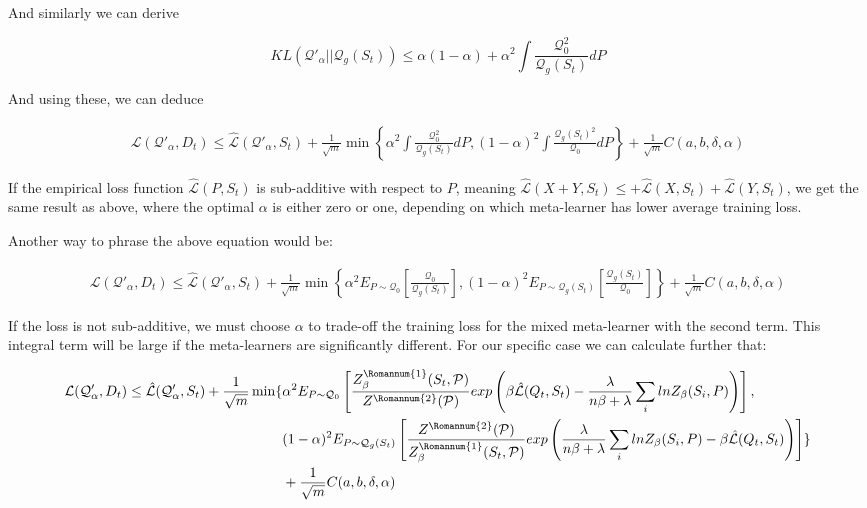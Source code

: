 \documentclass[letterpaper]{article}
\theoremstyle{definition}
\begin{document}
And similarly we can derive 

$$ KL(\mathcal{Q}'_\alpha||\mathcal{Q}_{g}(S_t)) \leq \alpha(1-\alpha) + \alpha^2\int \frac{\mathcal{Q}_0^2}{\mathcal{Q}_{g}(S_t)}  dP$$

And using these, we can deduce

\begin{equation}
\begin{split}
\mathcal{L}(\mathcal{Q}'_\alpha, D_t) \leq  \hat{\mathcal{L}}(\mathcal{Q}'_\alpha, S_t) + \frac{1}{\sqrt{m}}\min\left \{\alpha^2\int \frac{\mathcal{Q}_0^2}{\mathcal{Q}_{g}(S_t)}  dP, (1-\alpha)^2\int \frac{\mathcal{Q}_{g}(S_t)^2}{\mathcal{Q}_0}  dP\right \} + \frac{1}{\sqrt{m}}C(a,b,\delta, \alpha)
\end{split}
\end{equation}

If the empirical loss function $\hat{\mathcal{L}}(P, S_t)$ is sub-additive with respect to $P$, meaning $\hat{\mathcal{L}}(X+Y, S_t)\leq +\hat{\mathcal{L}}(X, S_t)+\hat{\mathcal{L}}(Y, S_t)$,
we get the same result as above, where the optimal $\alpha$ is either zero or one, depending on which meta-learner has lower average training loss.

Another way to phrase the above equation would be:

\begin{equation}
\begin{split}
\mathcal{L}(\mathcal{Q}'_\alpha, D_t) \leq  \hat{\mathcal{L}}(\mathcal{Q}'_\alpha, S_t) + \frac{1}{\sqrt{m}}\min\left \{\alpha^2 E_{P\sim \mathcal{Q}_0} \left [ \frac{\mathcal{Q}_0}{\mathcal{Q}_{g}(S_t)} \right ], (1-\alpha)^2 E_{P\sim \mathcal{Q}_{g}(S_t)} \left [ \frac{\mathcal{Q}_{g}(S_t)}{\mathcal{Q}_0} \right ]\right \} + \frac{1}{\sqrt{m}}C(a,b,\delta, \alpha)
\end{split}
\end{equation}

If the loss is not sub-additive, we must choose $\alpha$ to trade-off the training loss for the mixed meta-learner with the second term. This integral term will be large if the meta-learners are significantly different. For our specific case we can calculate further that:

\begin{equation*}
\begin{split}
\mathcal{L}(\mathcal{Q}'_\alpha, D_t) \leq  \hat{\mathcal{L}}(\mathcal{Q}'_\alpha, S_t) + \frac{1}{\sqrt{m}}\min \{ &\alpha^2 E_{P\sim \mathcal{Q}_0}\left [ \frac{Z^{\text{\Romannum{1}}}_\beta(S_t, \mathcal{P})}{Z^{\text{\Romannum{2}}}(\mathcal{P})}  exp\left ( \beta \hat{\mathcal{L}}(Q_t, S_t)-\frac{\lambda}{n\beta+\lambda}\sum_i lnZ_\beta(S_i,P) \right ) \right ],\\ &(1-\alpha)^2 E_{P\sim \mathcal{Q}_{g}(S_t)}\left [ \frac{Z^{\text{\Romannum{2}}}(\mathcal{P})}{Z^{\text{\Romannum{1}}}_\beta(S_t, \mathcal{P})}  exp\left ( \frac{\lambda}{n\beta+\lambda}\sum_i lnZ_\beta(S_i,P)-\beta \hat{\mathcal{L}}(Q_t, S_t) \right ) \right ]  \}\\&+ \frac{1}{\sqrt{m}}C(a,b,\delta, \alpha)
\end{split}
\end{equation*}
\end{document}
